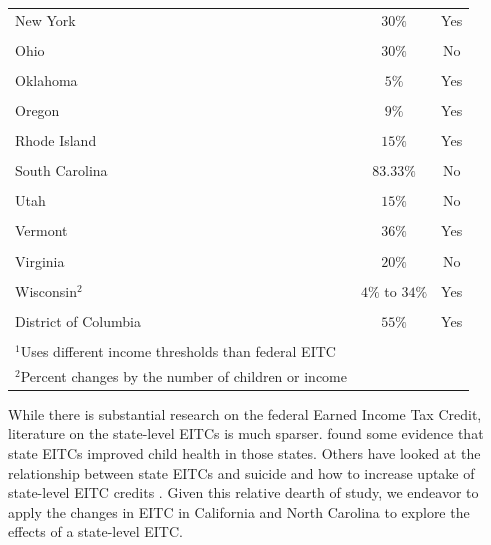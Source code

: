 \documentclass{article}
\begin{document}
\begin{longtable}[h]{lcc}
\\[-1.8ex] 
 New York & $30\%$ & Yes \\
\\[-1.8ex] 
 Ohio & $30\%$ & No \\
\\[-1.8ex] 
 Oklahoma & $5\%$ & Yes \\
\\[-1.8ex] 
 Oregon & $9\%$ & Yes \\
\\[-1.8ex] 
 Rhode Island & $15\%$ & Yes \\
\\[-1.8ex] 
 South Carolina & $83.33\%$ & No \\
\\[-1.8ex] 
 Utah & $15\%$ & No \\
\\[-1.8ex] 
 Vermont & $36\%$ & Yes \\
\\[-1.8ex] 
 Virginia & $20\%$ & No \\
\\[-1.8ex] 
 Wisconsin$^{2}$ & $4\%$ to $34\%$ & Yes \\
\\[-1.8ex] 
 District of Columbia & $55\%$ & Yes \\
 \hline\\[-1.8ex] 
\footnotesize $^{1}$Uses different income thresholds than federal EITC\\
\footnotesize $^{2}$Percent changes by the number of children or income
\label{fig:eitc_states}{}
\end{longtable}



While there is substantial research on the federal Earned Income Tax Credit, literature on the state-level EITCs is much sparser. \cite{baughman2012effects} found some evidence that state EITCs improved child health in those states. Others have looked at the relationship between state EITCs and suicide \citep{lenhart2019effects} and how to increase uptake of state-level EITC credits \citep{linos2020can}. Given this relative dearth of study, we endeavor to apply the changes in EITC in California and North Carolina to explore the effects of a state-level EITC.  
\end{document}
